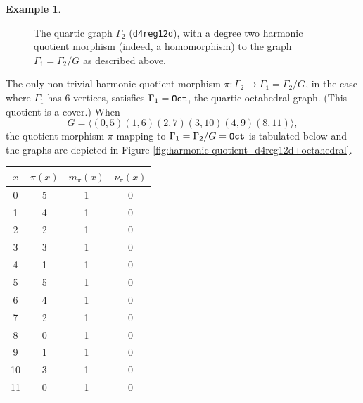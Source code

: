 \documentclass[12pt,letterpaper]{article}
\theoremstyle{definition}
\newtheorem{example}[theorem]{Example}
\begin{document}
\begin{example}
{\begin{figure}[H]
\begin{minipage}{\textwidth}
\begin{center}
%
\end{center}
\end{minipage}
\caption{The quartic graph $\Gamma_2$ ({\tt d4reg12d}), with a degree two harmonic quotient morphism (indeed, a homomorphism) to the graph $\Gamma_1=\Gamma_2/G$ as described above.}
\label{fig:harmonic-quotient_d4reg12d+FB_BR_lg}
\end{figure}


The only non-trivial harmonic quotient morphism
$\pi: \Gamma_2\to \Gamma_1=\Gamma_2/G$, in the case where
$\Gamma_1$ has $6$ vertices, satisfies $\Gamma_1={\tt Oct}$,
the quartic octahedral graph. (This quotient is a cover.)
When
\[
G = \langle (0,5)(1,6)(2,7)(3,10)(4,9)(8,11) \rangle ,
\]
the quotient morphism $\pi$ mapping to
$\Gamma_1=\Gamma_2/G ={\tt Oct}$
is tabulated below
and the graphs are depicted in
Figure \ref{fig:harmonic-quotient_d4reg12d+octahedral}. 

\begin{center}
\begin{tabular}{c|c|c|c}  
  $x$ & $\pi(x)$ & $m_\pi(x)$ & $\nu_\pi(x)$   \\ \hline
  0   &    5   &        1         &  0  \\ 
  1   &    4   &        1         &  0  \\ 
  2   &    2   &        1         &  0  \\ 
  3   &    3   &        1         &  0   \\
  4   &    1   &        1         &  0   \\
  5   &    5   &        1         &  0   \\
  6   &    4   &        1         &  0   \\
  7   &    2   &        1         &  0   \\
  8   &    0   &        1         &  0   \\
  9   &    1   &        1         &  0  \\   
  10  &    3  &         1         &  0  \\
  11  &    0   &        1         &  0  \\  
\end{tabular}
\end{center}

}
\end{example}
\end{document}

